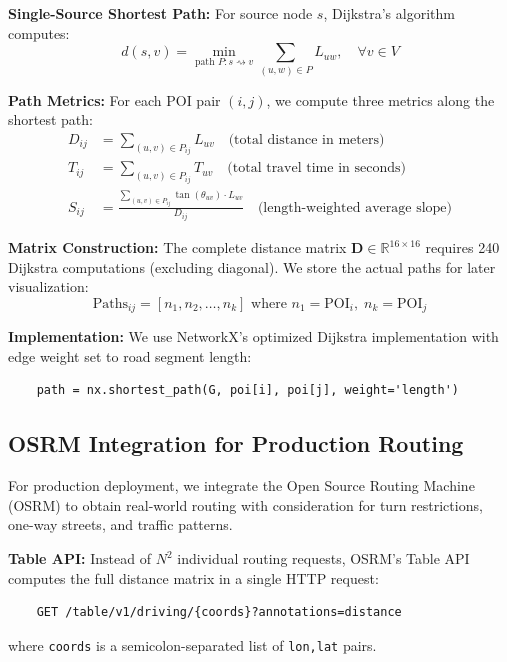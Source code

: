 \documentclass[11pt,a4paper]{article}
\begin{document}
\textbf{Single-Source Shortest Path:} For source node $s$, Dijkstra's algorithm computes:
\begin{equation}
d(s, v) = \min_{\text{path } P: s \rightsquigarrow v} \sum_{(u,w) \in P} L_{uw}, \quad \forall v \in V
\end{equation}

\textbf{Path Metrics:} For each POI pair $(i, j)$, we compute three metrics along the shortest path:
\begin{align}
D_{ij} &= \sum_{(u,v) \in P_{ij}} L_{uv} \quad \text{(total distance in meters)} \\
T_{ij} &= \sum_{(u,v) \in P_{ij}} T_{uv} \quad \text{(total travel time in seconds)} \\
S_{ij} &= \frac{\sum_{(u,v) \in P_{ij}} \tan(\theta_{uv}) \cdot L_{uv}}{D_{ij}} \quad \text{(length-weighted average slope)}
\end{align}

\textbf{Matrix Construction:} The complete distance matrix $\mathbf{D} \in \mathbb{R}^{16 \times 16}$ requires 240 Dijkstra computations (excluding diagonal). We store the actual paths for later visualization:
\begin{equation}
\text{Paths}_{ij} = [n_1, n_2, \ldots, n_k] \text{ where } n_1 = \text{POI}_i, \; n_k = \text{POI}_j
\end{equation}

\textbf{Implementation:} We use NetworkX's optimized Dijkstra implementation with edge weight set to road segment length:
\begin{verbatim}
    path = nx.shortest_path(G, poi[i], poi[j], weight='length')
\end{verbatim}

\subsection{OSRM Integration for Production Routing}

For production deployment, we integrate the Open Source Routing Machine (OSRM) to obtain real-world routing with consideration for turn restrictions, one-way streets, and traffic patterns.

\textbf{Table API:} Instead of $N^2$ individual routing requests, OSRM's Table API computes the full distance matrix in a single HTTP request:
\begin{verbatim}
    GET /table/v1/driving/{coords}?annotations=distance
\end{verbatim}
where \texttt{coords} is a semicolon-separated list of \texttt{lon,lat} pairs.
\end{document}
